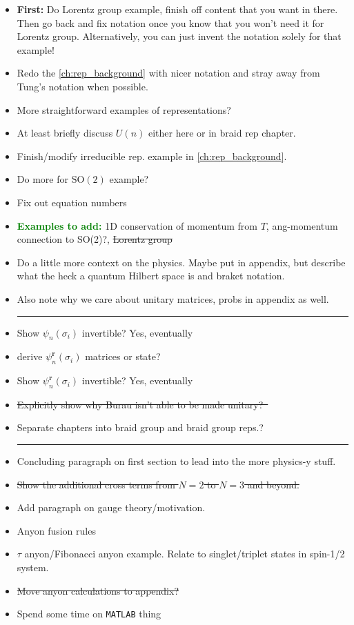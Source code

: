 \begin{itemize}

    \item \textbf{First:} Do Lorentz group example, finish off content that you want in there. Then go back and fix notation once you know that you won't need it for Lorentz group. Alternatively, you can just invent the notation solely for that example!
    \item Redo the \cref{ch:rep_background} with nicer notation and stray away from Tung's notation when possible.
    \item More straightforward examples of representations?
    \item At least briefly discuss $U(n)$ either here or in braid rep chapter.
    \item Finish/modify irreducible rep. example in \cref{ch:rep_background}.
    \item Do more for $\textrm{SO}(2)$ example?
    \item Fix out equation numbers
    \item \textcolor{Green}{\textbf{Examples to add:}} 1D conservation of momentum from $T$, ang-momentum connection to SO(2)?, \sout{Lorentz group}
    \item Do a little more context on the physics. Maybe put in appendix, but describe what the heck a quantum Hilbert space is and braket notation.
    \item Also note why we care about unitary matrices, probs in appendix as well.
    
    \begin{center}\rule{.85\textwidth}{0.65pt}\end{center}
    
    \item Show $\psi_n(\sigma_i)$ invertible? Yes, eventually
    \item derive $\psi_n^\textbf{r}(\sigma_i)$ matrices or state?
    \item Show $\psi_n^\textbf{r}(\sigma_i)$ invertible? Yes, eventually
    \item \sout{Explicitly show why Burau isn't able to be made unitary?~\cite{Delaney2016}}
    \item Separate chapters into braid group and braid group reps.?
    
    \begin{center}\rule{.85\textwidth}{0.65pt}\end{center}
    
    \item Concluding paragraph on first section to lead into the more physics-y stuff.
    \item \sout{Show the additional cross terms from $N=2$ to $N=3$ and beyond.}
    \item Add paragraph on gauge theory/motivation.
    \item Anyon fusion rules
    \item $\tau$ anyon/Fibonacci anyon example. Relate to singlet/triplet states in spin-1/2 system.
    \item \sout{Move anyon calculations to appendix?}
    \item Spend some time on \texttt{MATLAB} thing


\end{itemize}
